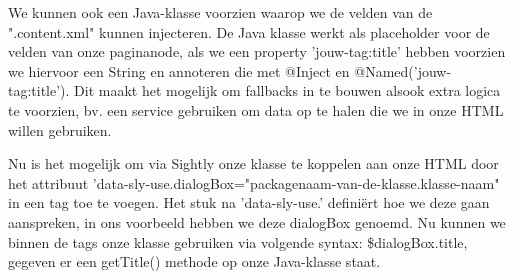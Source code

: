 \documentclass{article}
\begin{document}
	\par
	We kunnen ook een Java-klasse voorzien waarop we de velden van de ".content.xml" kunnen injecteren. De Java klasse werkt als placeholder voor de velden van onze paginanode, als we een property 'jouw-tag:title' hebben voorzien we hiervoor een String en annoteren die met @Inject en @Named('jouw-tag:title'). Dit maakt het mogelijk om fallbacks in te bouwen alsook extra logica te voorzien, bv. een service gebruiken om data op te halen die we in onze HTML willen gebruiken.  
	\par
	Nu is het mogelijk om via Sightly onze klasse te koppelen aan onze HTML door het attribuut 'data-sly-use.dialogBox="packagenaam-van-de-klasse.klasse-naam" in een tag toe te voegen. Het stuk na 'data-sly-use.' defini\"ert hoe we deze gaan aanspreken, in ons voorbeeld hebben we deze dialogBox genoemd. Nu kunnen we binnen de tags onze klasse gebruiken via volgende syntax: \${dialogBox.title}, gegeven er een getTitle() methode op onze Java-klasse staat.
\end{document}
